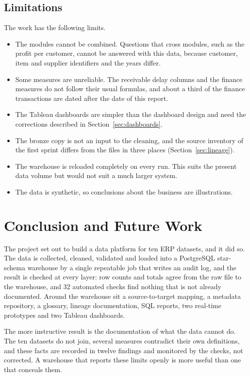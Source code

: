 \documentclass[12pt,a4paper]{report}
\begin{document}
\section{Limitations}\label{sec:limits}
The work has the following limits.
\begin{itemize}
\item The modules cannot be combined. Questions that cross modules, such as the profit per customer, cannot be answered with this data, because customer, item and supplier identifiers and the years differ.
\item Some measures are unreliable. The receivable delay columns and the finance measures do not follow their usual formulas, and about a third of the finance transactions are dated after the date of this report.
\item The Tableau dashboards are simpler than the dashboard design and need the corrections described in Section~\ref{sec:dashboards}.
\item The bronze copy is not an input to the cleaning, and the source inventory of the first sprint differs from the files in three places (Section~\ref{sec:lineage}).
\item The warehouse is reloaded completely on every run. This suits the present data volume but would not suit a much larger system.
\item The data is synthetic, so conclusions about the business are illustrations.
\end{itemize}

\chapter{Conclusion and Future Work}\label{ch:concl}
The project set out to build a data platform for ten ERP datasets, and it did so. The data is collected, cleaned, validated and loaded into a PostgreSQL star-schema warehouse by a single repeatable job that writes an audit log, and the result is checked at every layer: row counts and totals agree from the raw file to the warehouse, and 32 automated checks find nothing that is not already documented. Around the warehouse sit a source-to-target mapping, a metadata repository, a glossary, lineage documentation, SQL reports, two real-time prototypes and two Tableau dashboards.

The more instructive result is the documentation of what the data cannot do. The ten datasets do not join, several measures contradict their own definitions, and these facts are recorded in twelve findings and monitored by the checks, not corrected. A warehouse that reports these limits openly is more useful than one that conceals them.
\end{document}
